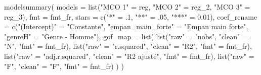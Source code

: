 \documentclass[
  11pt,
]{book}
\newenvironment{Shaded}{\begin{snugshade}}{\end{snugshade}}
\newcommand{\AttributeTok}[1]{\textcolor[rgb]{0.77,0.63,0.00}{#1}}
\newcommand{\DecValTok}[1]{\textcolor[rgb]{0.00,0.00,0.81}{#1}}
\newcommand{\FloatTok}[1]{\textcolor[rgb]{0.00,0.00,0.81}{#1}}
\newcommand{\FunctionTok}[1]{\textcolor[rgb]{0.00,0.00,0.00}{#1}}
\newcommand{\NormalTok}[1]{#1}
\newcommand{\OtherTok}[1]{\textcolor[rgb]{0.56,0.35,0.01}{#1}}
\newcommand{\StringTok}[1]{\textcolor[rgb]{0.31,0.60,0.02}{#1}}
\numberwithin{equation}{section}
\numberwithin{countremarque}{section}
\begin{document}
\begin{Shaded}
\begin{Highlighting}[]
\FunctionTok{modelsummary}\NormalTok{(}
  \AttributeTok{models =} \FunctionTok{list}\NormalTok{(}\StringTok{"MCO 1"} \OtherTok{=}\NormalTok{ reg,}
                \StringTok{"MCO 2"} \OtherTok{=}\NormalTok{ reg\_2,}
                \StringTok{"MCO 3"} \OtherTok{=}\NormalTok{ reg\_3),}
  \AttributeTok{fmt =}\NormalTok{ fmt\_fr,}
  \AttributeTok{stars =} \FunctionTok{c}\NormalTok{(}\StringTok{"*"} \OtherTok{=}\NormalTok{ .}\DecValTok{1}\NormalTok{, }\StringTok{"**"} \OtherTok{=}\NormalTok{ .}\DecValTok{05}\NormalTok{, }\StringTok{"***"} \OtherTok{=} \FloatTok{0.01}\NormalTok{),}
  \AttributeTok{coef\_rename =} \FunctionTok{c}\NormalTok{(}\StringTok{"(Intercept)"} \OtherTok{=} \StringTok{"Constante"}\NormalTok{,}
                  \StringTok{"empan\_main\_forte"} \OtherTok{=} \StringTok{"Empan main forte"}\NormalTok{,}
                  \StringTok{"genreH"} \OtherTok{=} \StringTok{"Genre {-} Homme"}\NormalTok{),}
  \AttributeTok{gof\_map =} \FunctionTok{list}\NormalTok{(}
    \FunctionTok{list}\NormalTok{(}\StringTok{"raw"} \OtherTok{=} \StringTok{"nobs"}\NormalTok{, }\StringTok{"clean"} \OtherTok{=} \StringTok{"N"}\NormalTok{, }\StringTok{"fmt"} \OtherTok{=}\NormalTok{ fmt\_fr),}
    \FunctionTok{list}\NormalTok{(}\StringTok{"raw"} \OtherTok{=} \StringTok{"r.squared"}\NormalTok{, }\StringTok{"clean"} \OtherTok{=} \StringTok{"R2"}\NormalTok{, }\StringTok{"fmt"} \OtherTok{=}\NormalTok{ fmt\_fr),}
    \FunctionTok{list}\NormalTok{(}\StringTok{"raw"} \OtherTok{=} \StringTok{"adj.r.squared"}\NormalTok{, }\StringTok{"clean"} \OtherTok{=} \StringTok{"R2 ajusté"}\NormalTok{, }\StringTok{"fmt"} \OtherTok{=}\NormalTok{ fmt\_fr),}
    \FunctionTok{list}\NormalTok{(}\StringTok{"raw"} \OtherTok{=} \StringTok{"F"}\NormalTok{, }\StringTok{"clean"} \OtherTok{=} \StringTok{"F"}\NormalTok{, }\StringTok{"fmt"} \OtherTok{=}\NormalTok{ fmt\_fr)}
\NormalTok{  )}
\NormalTok{)}
\end{Highlighting}
\end{Shaded}
\end{document}

